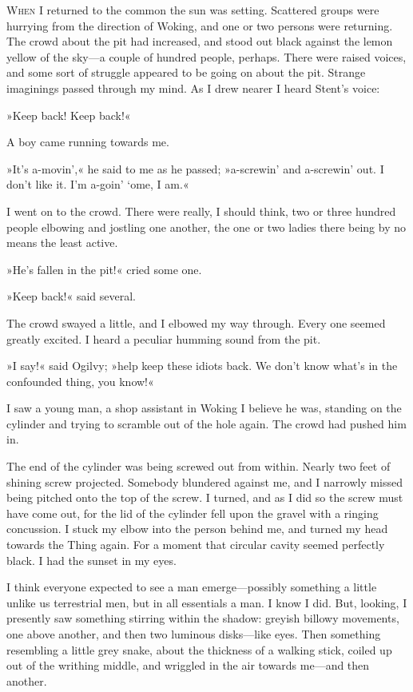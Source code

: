 


\lettrine[lines=4]{W}{hen} I returned to the common the sun was setting. Scattered groups were hurrying from the direction of Woking, and one or two persons were returning. The crowd about the pit had increased, and stood out black against the lemon yellow of the sky—a couple of hundred people, perhaps. There were raised voices, and some sort of struggle appeared to be going on about the pit. Strange imaginings passed through my mind. As I drew nearer I heard Stent's voice:

»Keep back! Keep back!«

A boy came running towards me.

»It's a-movin',« he said to me as he passed; »a-screwin' and a-screwin' out. I don't like it. I'm a-goin' `ome, I am.«

I went on to the crowd. There were really, I should think, two or three hundred people elbowing and jostling one another, the one or two ladies there being by no means the least active.

»He's fallen in the pit!« cried some one.

»Keep back!« said several.

The crowd swayed a little, and I elbowed my way through. Every one seemed greatly excited. I heard a peculiar humming sound from the pit.

»I say!« said Ogilvy; »help keep these idiots back. We don't know what's in the confounded thing, you know!«

I saw a young man, a shop assistant in Woking I believe he was, standing on the cylinder and trying to scramble out of the hole again. The crowd had pushed him in.

The end of the cylinder was being screwed out from within. Nearly two feet of shining screw projected. Somebody blundered against me, and I narrowly missed being pitched onto the top of the screw. I turned, and as I did so the screw must have come out, for the lid of the cylinder fell upon the gravel with a ringing concussion. I stuck my elbow into the person behind me, and turned my head towards the Thing again. For a moment that circular cavity seemed perfectly black. I had the sunset in my eyes.

I think everyone expected to see a man emerge—possibly something a little unlike us terrestrial men, but in all essentials a man. I know I did. But, looking, I presently saw something stirring within the shadow: greyish billowy movements, one above another, and then two luminous disks—like eyes. Then something resembling a little grey snake, about the thickness of a walking stick, coiled up out of the writhing middle, and wriggled in the air towards me—and then another.

